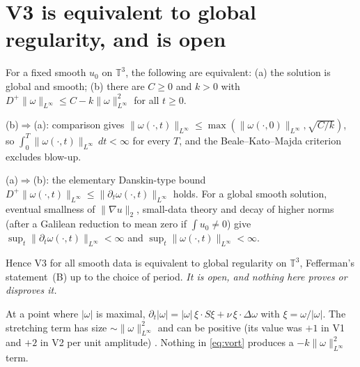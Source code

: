 \documentclass[11pt]{article}
\newcommand{\T}{\mathbb{T}^3}
\theoremstyle{remark}
\begin{document}
\section{V3 is equivalent to global regularity, and is open}
For a fixed smooth $u_0$ on $\T$, the following are equivalent: (a) the solution is global and smooth; (b) there are
$C\ge0$ and $k>0$ with $D^+\|\omega\|_{L^\infty}\le C-k\|\omega\|_{L^\infty}^2$ for all $t\ge0$.

(b)$\Rightarrow$(a): comparison gives $\|\omega(\cdot,t)\|_{L^\infty}\le\max(\|\omega(\cdot,0)\|_{L^\infty},\sqrt{C/k})$, so $\int_0^T\|\omega(\cdot,t)\|_{L^\infty}\,dt<\infty$ for every $T$, and the
Beale--Kato--Majda criterion \cite{BKM1984} excludes blow-up.

(a)$\Rightarrow$(b): the elementary Danskin-type bound $D^+\|\omega(\cdot,t)\|_{L^\infty}\le\|\partial_t\omega(\cdot,t)\|_{L^\infty}$ holds. For a global
smooth solution, eventual smallness of $\|\nabla u\|_2$, small-data theory and decay of higher norms
\cite{RRS2016,FoiasTemam1989} (after a Galilean reduction to mean zero if $\int u_0\ne0$) give $\sup_t\|\partial_t\omega(\cdot,t)\|_{L^\infty}<\infty$ and $\sup_t\|\omega(\cdot,t)\|_{L^\infty}<\infty$.

Hence V3 for all smooth data is equivalent to global regularity on $\T$, Fefferman's statement~(B) \cite{Fefferman}
up to the choice of period. \emph{It is open, and nothing here proves or disproves it.}

At a point where $|\omega|$ is maximal, $\partial_t|\omega|=|\omega|\,\xi\cdot S\xi+\nu\,\xi\cdot\Delta\omega$ with
$\xi=\omega/|\omega|$. The stretching term has size $\sim\|\omega\|_{L^\infty}^2$ and can be positive (its value was $+1$ in V1 and $+2$ in V2
per unit amplitude) \cite{MajdaBertozzi2002}. Nothing in \eqref{eq:vort} produces a $-k\|\omega\|_{L^\infty}^2$ term.
\end{document}
